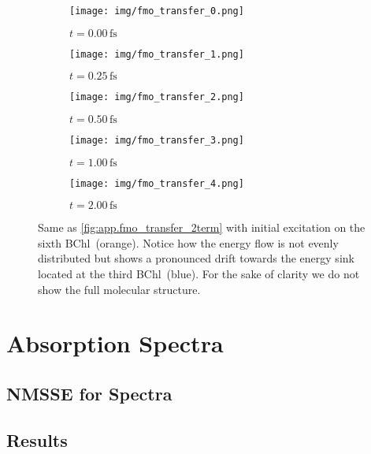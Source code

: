 \begin{figure}[p]
  \centering
  \begin{subfigure}[b]{0.3\textwidth}
    \texttt{[image: img/fmo\_transfer\_0.png]}
    \caption{%
      $t = 0.00 \, \mathrm{fs}$
    }
  \end{subfigure}
  \begin{subfigure}[b]{0.3\textwidth}
    \texttt{[image: img/fmo\_transfer\_1.png]}
    \caption{%
      $t = 0.25 \, \mathrm{fs}$
    }
  \end{subfigure}
  \begin{subfigure}[b]{0.3\textwidth}
    \texttt{[image: img/fmo\_transfer\_2.png]}
    \caption{%
      $t = 0.50 \, \mathrm{fs}$
    }
  \end{subfigure}
  \vspace{1cm}

  \begin{subfigure}[b]{0.3\textwidth}
    \texttt{[image: img/fmo\_transfer\_3.png]}
    \caption{%
      $t = 1.00 \, \mathrm{fs}$
    }
  \end{subfigure}
  \begin{subfigure}[b]{0.3\textwidth}
    \texttt{[image: img/fmo\_transfer\_4.png]}
    \caption{%
      $t = 2.00 \, \mathrm{fs}$
    }
  \end{subfigure}

  \caption{%
    Same as \autoref{fig:app.fmo_transfer_2term} with initial excitation on the sixth BChl~(orange).
    Notice how the energy flow is not evenly distributed but shows a pronounced drift towards the energy sink located at the third BChl~(blue).
    For the sake of clarity we do not show the full molecular structure.
  }
\end{figure}

\section{Absorption Spectra}
\label{sec:app.spectra}

\subsection{NMSSE for Spectra}
\label{sub:app.spectra.nmsse}

\subsection{Results}
\label{sub:app.spectra.results}
